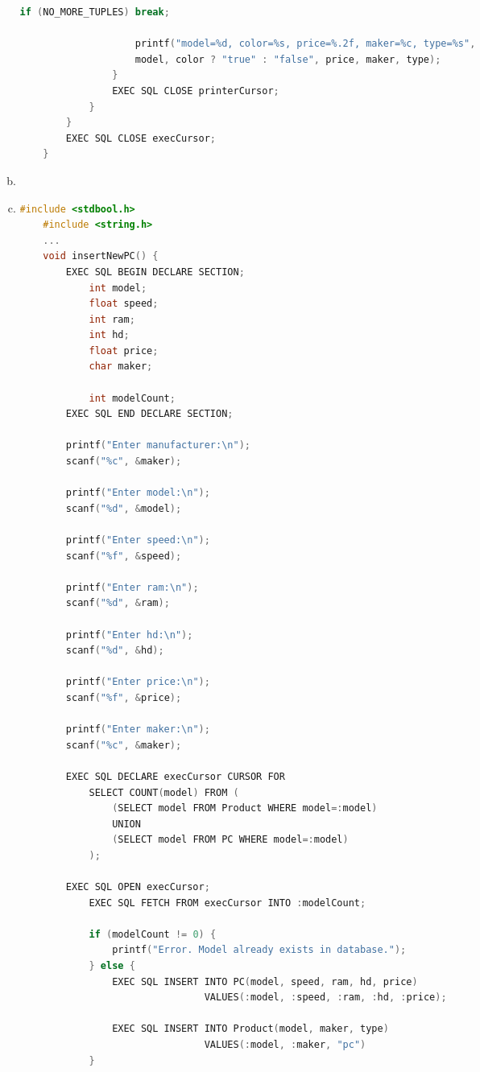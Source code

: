 \documentclass[12pt]{article}
\begin{document}
\begin{enumerate}[1.]
\begin{enumerate}[a)]
\begin{lstlisting}[language=c]
                    if (NO_MORE_TUPLES) break;

                    printf("model=%d, color=%s, price=%.2f, maker=%c, type=%s",
                    model, color ? "true" : "false", price, maker, type);
                }
                EXEC SQL CLOSE printerCursor;
            }
        }
        EXEC SQL CLOSE execCursor;
    }
    \end{lstlisting}
        \item
        \item

    \begin{lstlisting}[language=c]
    #include <stdbool.h>
    #include <string.h>
    ...
    void insertNewPC() {
        EXEC SQL BEGIN DECLARE SECTION;
            int model;
            float speed;
            int ram;
            int hd;
            float price;
            char maker;

            int modelCount;
        EXEC SQL END DECLARE SECTION;

        printf("Enter manufacturer:\n");
        scanf("%c", &maker);

        printf("Enter model:\n");
        scanf("%d", &model);

        printf("Enter speed:\n");
        scanf("%f", &speed);

        printf("Enter ram:\n");
        scanf("%d", &ram);

        printf("Enter hd:\n");
        scanf("%d", &hd);

        printf("Enter price:\n");
        scanf("%f", &price);

        printf("Enter maker:\n");
        scanf("%c", &maker);

        EXEC SQL DECLARE execCursor CURSOR FOR
            SELECT COUNT(model) FROM (
                (SELECT model FROM Product WHERE model=:model)
                UNION
                (SELECT model FROM PC WHERE model=:model)
            );

        EXEC SQL OPEN execCursor;
            EXEC SQL FETCH FROM execCursor INTO :modelCount;

            if (modelCount != 0) {
                printf("Error. Model already exists in database.");
            } else {
                EXEC SQL INSERT INTO PC(model, speed, ram, hd, price)
                                VALUES(:model, :speed, :ram, :hd, :price);

                EXEC SQL INSERT INTO Product(model, maker, type)
                                VALUES(:model, :maker, "pc")
            }



\end{lstlisting}
\end{enumerate}
\end{enumerate}
\end{document}
